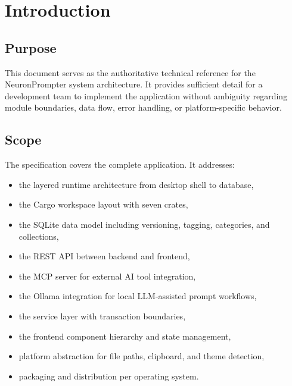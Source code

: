 \documentclass[a4paper, 11pt, oneside]{report}
\begin{document}
\tableofcontents
\clearpage

\chapter{Introduction}
\label{ch:introduction}

\section{Purpose}
\label{sec:purpose}

This document serves as the authoritative technical reference for the
NeuronPrompter system architecture.  It provides sufficient detail for a
development team to implement the application without ambiguity regarding
module boundaries, data flow, error handling, or platform-specific behavior.

\section{Scope}
\label{sec:scope}

The specification covers the complete application.  It addresses:

\begin{itemize}
  \item the layered runtime architecture from desktop shell to database,
  \item the Cargo workspace layout with seven crates,
  \item the SQLite data model including versioning, tagging, categories,
        and collections,
  \item the REST API between backend and frontend,
  \item the MCP server for external AI tool integration,
  \item the Ollama integration for local LLM-assisted prompt workflows,
  \item the service layer with transaction boundaries,
  \item the frontend component hierarchy and state management,
  \item platform abstraction for file paths, clipboard, and theme detection,
  \item packaging and distribution per operating system.
\end{itemize}
\end{document}

